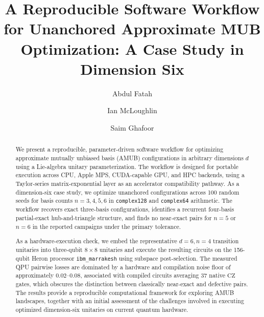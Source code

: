 \documentclass[a4paper,twocolumn,11pt,amsfonts,amssymb]{quantumarticle}
\begin{document}
\title{A Reproducible Software Workflow for Unanchored Approximate MUB Optimization: A Case Study in Dimension Six}
\author{Abdul Fatah}

\author{Ian McLoughlin}

\author{Saim Ghafoor}

\maketitle
\begin{abstract}
We present a reproducible, parameter-driven software workflow for optimizing approximate mutually unbiased basis (AMUB) configurations in arbitrary dimensions \(d\) using a Lie-algebra unitary parameterization. The workflow is designed for portable execution across CPU, Apple MPS, CUDA-capable GPU, and HPC backends, using a Taylor-series matrix-exponential layer as an accelerator compatibility pathway. As a dimension-six case study, we optimize unanchored configurations across 100 random seeds for basis counts \(n=3,4,5,6\) in \texttt{complex128} and \texttt{complex64} arithmetic. The workflow recovers exact three-basis configurations, identifies a recurrent four-basis partial-exact hub-and-triangle structure, and finds no near-exact pairs for \(n=5\) or \(n=6\) in the reported campaigns under the primary tolerance.

As a hardware-execution check, we embed the representative \(d=6,n=4\) transition unitaries into three-qubit \(8\times 8\) unitaries and execute the resulting circuits on the 156-qubit Heron processor \texttt{ibm\_marrakesh} using subspace post-selection. The measured QPU pairwise losses are dominated by a hardware and compilation noise floor of approximately \(0.02\)--\(0.08\), associated with compiled circuits averaging 37 native \(\mathrm{CZ}\) gates, which obscures the distinction between classically near-exact and defective pairs. The results provide a reproducible computational framework for exploring AMUB landscapes, together with an initial assessment of the challenges involved in executing optimized dimension-six unitaries on current quantum hardware.
\end{abstract}
\end{document}

